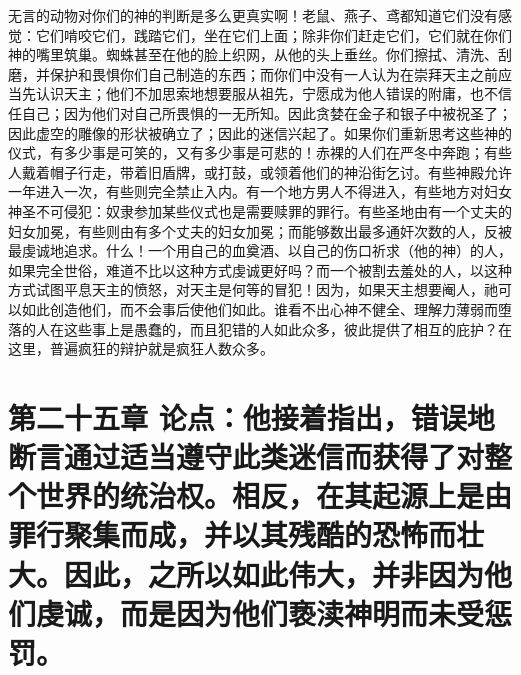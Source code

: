 无言的动物对你们的神的判断是多么更真实啊！老鼠、燕子、鸢都知道它们没有感觉：它们啃咬它们，践踏它们，坐在它们上面；除非你们赶走它们，它们就在你们神的嘴里筑巢。蜘蛛甚至在他的脸上织网，从他的头上垂丝。你们擦拭、清洗、刮磨，并保护和畏惧你们自己制造的东西；而你们中没有一人认为在崇拜天主之前应当先认识天主；他们不加思索地想要服从祖先，宁愿成为他人错误的附庸，也不信任自己；因为他们对自己所畏惧的一无所知。因此贪婪在金子和银子中被祝圣了；因此虚空的雕像的形状被确立了；因此的迷信兴起了。如果你们重新思考这些神的仪式，有多少事是可笑的，又有多少事是可悲的！赤裸的人们在严冬中奔跑；有些人戴着帽子行走，带着旧盾牌，或打鼓，或领着他们的神沿街乞讨。有些神殿允许一年进入一次，有些则完全禁止入内。有一个地方男人不得进入，有些地方对妇女神圣不可侵犯：奴隶参加某些仪式也是需要赎罪的罪行。有些圣地由有一个丈夫的妇女加冕，有些则由有多个丈夫的妇女加冕；而能够数出最多通奸次数的人，反被最虔诚地追求。什么！一个用自己的血奠酒、以自己的伤口祈求（他的神）的人，如果完全世俗，难道不比以这种方式虔诚更好吗？而一个被割去羞处的人，以这种方式试图平息天主的愤怒，对天主是何等的冒犯！因为，如果天主想要阉人，祂可以如此创造他们，而不会事后使他们如此。谁看不出心神不健全、理解力薄弱而堕落的人在这些事上是愚蠢的，而且犯错的人如此众多，彼此提供了相互的庇护？在这里，普遍疯狂的辩护就是疯狂人数众多。\par


\section{第二十五章 论点：他接着指出，错误地断言通过适当遵守此类迷信而获得了对整个世界的统治权。相反，在其起源上是由罪行聚集而成，并以其残酷的恐怖而壮大。因此，之所以如此伟大，并非因为他们虔诚，而是因为他们亵渎神明而未受惩罚。}


